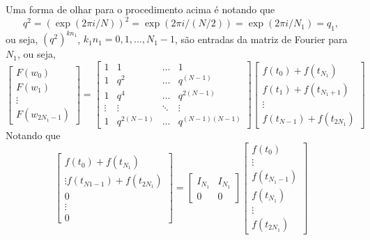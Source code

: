 Uma forma de olhar para o procedimento acima é notando que
\begin{dmath*}
  q^2 = \left( \exp(2 \pi i / N) \right)^2
  = \exp(2 \pi i / (N / 2))
  = \exp(2 \pi i / N_1)
  = q_1,
\end{dmath*}
ou seja, $(q^2)^{k n_1}$, $k_1 n_1 = 0, 1, \ldots, N_1 - 1$, são entradas da
matriz de Fourier para $N_1$, ou seja,
\begin{dmath*}
  \begin{bmatrix}
    F(w_0) \\
    F(w_1) \\
    \vdots \\
    F(w_{2 N_1 - 1})
  \end{bmatrix} =  \begin{bmatrix}
    1 & 1 & \ldots & 1 \\
    1 & q^{2} & \ldots & q^{(N - 1)} \\
    1 & q^{4} & \ldots & q^{2(N - 1)} \\
    \vdots & \vdots & \ddots & \vdots \\
    1 & q^{2 (N - 1)} & \ldots & q^{(N - 1)(N - 1)}
  \end{bmatrix} \begin{bmatrix}
    f(t_0) + f(t_{N_1}) \\
    f(t_1) + f(t_{N_1 + 1})\\
    \vdots \\
    f(t_{N - 1}) + f(t_{2 N_1})
  \end{bmatrix}
\end{dmath*}
Notando que
\begin{dmath*}
  \begin{bmatrix}
    f(t_0) + f(t_{N_1}) \\
    \vdots
    f(t_{N{1} - 1}) + f(t_{2N_{1}}) \\
    0 \\
    \vdots \\
    0
  \end{bmatrix} = \begin{bmatrix}
    I_{N_{1}} & I_{N_{1}} \\
    0 & 0
    \end{bmatrix} \begin{bmatrix}
    f(t_0) \\
    \vdots \\
    f(t_{N_{1} - 1}) \\
    f(t_{N_{1}}) \\
    \vdots \\
    f(t_{2N_{1}})
  \end{bmatrix}
\end{dmath*}
